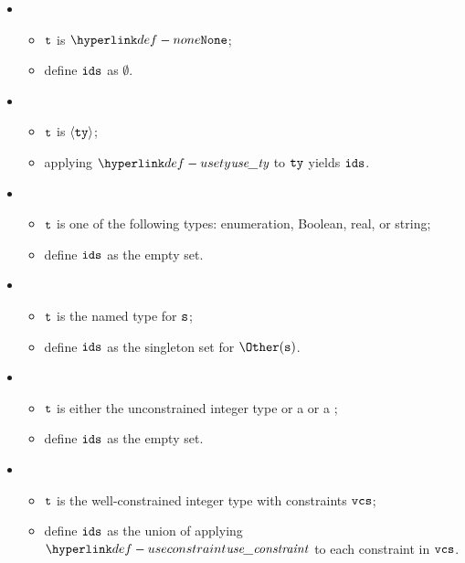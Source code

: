 \ProseParagraph
\OneApplies
\begin{itemize}
  \item {}
  \begin{itemize}
    \item $\texttt{t}$ is $\None$;
    \item define $\texttt{ids}$ as $\emptyset$.
  \end{itemize}

  \item {}
  \begin{itemize}
    \item $\texttt{t}$ is $\langle\texttt{ty}\rangle$;
    \item applying $\usety$ to $\texttt{ty}$ yields $\texttt{ids}$.
  \end{itemize}

  \item {}
  \begin{itemize}
    \item $\texttt{t}$ is one of the following types: enumeration, Boolean, real, or string;
    \item define $\texttt{ids}$ as the empty set.
  \end{itemize}

  \item {}
  \begin{itemize}
    \item $\texttt{t}$ is the named type for $\texttt{s}$;
    \item define $\texttt{ids}$ as the singleton set for $\Other(\vs)$.
  \end{itemize}

  \item {}
  \begin{itemize}
    \item $\texttt{t}$ is either the unconstrained integer type or a \parameterizedintegertypeterm{} or a \pendingconstrainedintegertypeterm;
    \item define $\texttt{ids}$ as the empty set.
  \end{itemize}

  \item {}
  \begin{itemize}
    \item $\texttt{t}$ is the well-constrained integer type with constraints $\texttt{vcs}$;
    \item define $\texttt{ids}$ as the union of applying $\useconstraint$ to each constraint in $\texttt{vcs}$.
  \end{itemize}


\end{itemize}
